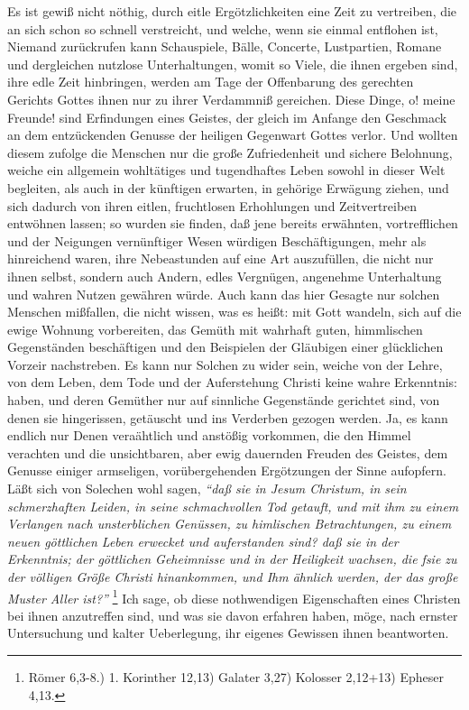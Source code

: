 Es ist gewiß nicht nöthig, durch eitle Ergötzlichkeiten eine Zeit zu vertreiben,
die an sich schon so schnell verstreicht, und welche, wenn sie einmal entflohen
ist, Niemand zurückrufen kann Schauspiele, Bälle, Concerte, Lustpartien, Romane
und dergleichen nutzlose Unterhaltungen, womit so Viele, die ihnen ergeben sind,
ihre edle Zeit hinbringen, werden am Tage der Offenbarung des gerechten Gerichts
Gottes ihnen nur zu ihrer Verdammniß gereichen. Diese Dinge, o! meine Freunde!
sind Erfindungen eines Geistes, der gleich im Anfange den Geschmack an dem
entzückenden Genusse der heiligen Gegenwart Gottes verlor. Und wollten diesem
zufolge die Menschen nur die große Zufriedenheit und sichere Belohnung, weiche
ein allgemein  wohltätiges und tugendhaftes Leben sowohl in dieser Welt
begleiten, als auch in der künftigen erwarten, in gehörige Erwägung ziehen, und
sich dadurch von ihren eitlen, fruchtlosen Erhohlungen und Zeitvertreiben
entwöhnen lassen; so wurden sie finden, daß jene bereits erwähnten,
vortrefflichen und der Neigungen vernünftiger Wesen würdigen Beschäftigungen,
mehr als hinreichend waren, ihre Nebeastunden auf eine Art auszufüllen, die
nicht nur ihnen selbst, sondern auch Andern, edles Vergnügen, angenehme
Unterhaltung und wahren Nutzen gewähren würde. Auch kann das hier Gesagte nur
solchen Menschen mißfallen, die nicht wissen, was es heißt: mit Gott wandeln,
sich auf die ewige Wohnung vorbereiten, das Gemüth mit wahrhaft guten,
himmlischen Gegenständen beschäftigen und den Beispielen der Gläubigen einer
glücklichen Vorzeir nachstreben. Es kann nur Solchen zu wider sein, weiche von
der Lehre, von dem Leben, dem Tode und der Auferstehung Christi keine wahre
Erkenntnis: haben, und deren Gemüther nur auf sinnliche Gegenstände gerichtet
sind, von denen sie hingerissen, getäuscht und ins Verderben gezogen werden. Ja,
es kann endlich nur Denen veraähtlich und anstößig vorkommen, die den Himmel
verachten und die unsichtbaren, aber ewig dauernden Freuden des Geistes, dem
Genusse einiger armseligen, vorübergehenden Ergötzungen der Sinne aufopfern.
Läßt sich von Solechen wohl sagen,
\textit{"`daß sie in Jesum Christum, in sein
schmerzhaften Leiden, in seine schmachvollen Tod getauft, und mit ihm zu einem
Verlangen nach unsterblichen Genüssen, zu himlischen Betrachtungen, zu einem
neuen göttlichen Leben erwecket und auferstanden sind? daß sie in der
Erkenntnis; der göttlichen Geheimnisse und in der Heiligkeit wachsen, die fsie
zu der völligen Größe Christi hinankommen, und Ihm ähnlich werden, der das große
Muster Aller ist?"'}
\footnote{Römer 6,3-8.) 1. Korinther 12,13) Galater 3,27) Kolosser 2,12+13)
Epheser 4,13.}
Ich sage, ob diese nothwendigen Eigenschaften eines Christen bei
ihnen anzutreffen sind, und was sie davon erfahren haben, möge, nach ernster
Untersuchung und kalter Ueberlegung, ihr eigenes Gewissen ihnen beantworten.

